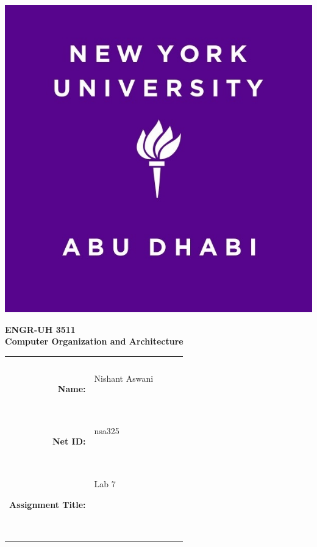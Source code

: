 \documentclass[twocolumn]{article}
\title{\myassignmenttitle}
\author{\myname, \myemail}
\affil{\myclassname (\mycoursenumber), Instructor \myinstructor}
\date{}
\newcommand{\myname}{Nishant Aswani}
\newcommand{\mynetid}{nsa325}
\newcommand{\myhwtype}{Lab }
\newcommand{\myhwnum}{7}
\newcommand{\mycoursenumber}{ENGR-UH 3511}
\newcommand{\myclassname}{Computer Organization and Architecture}
\begin{document}
\onecolumn
\pagestyle{fancy}
\fancyhf{}
\renewcommand{\headrulewidth}{0pt}

\begin{center}
  \includegraphics[scale=0.15]{etc/NYUAD-alt-logo.jpg}
\end{center}

{\vspace{2.5em}}

\begin{center}
    \Huge{\textbf{\mycoursenumber}}\\
    {\vspace{0.5em}}
    \Huge{\textbf{\myclassname}}
\end{center}

{\vspace{10em}}

\begin{center}
  \begin{tabular}{|rp{5.0cm}lll|}
    \hline
    &  &  &  & \\
    &  &  &  & \\
    \Large{\textbf{Name:}} & \Large{\myname}
    
    \  &  &  & \\
    \Large{\textbf{Net ID:}} & \Large{\mynetid}
    
    \  &  &  & \\
    \Large{\textbf{Assignment Title:}} & \Large{\myhwtype \myhwnum}
    
    \
    
    \  &  &  & \\
    \hline
  \end{tabular}
\end{center}
\end{document}
